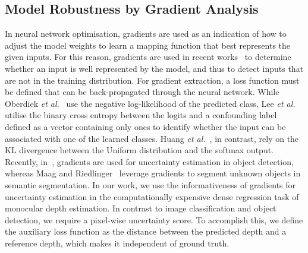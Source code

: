 \subsection{Model Robustness by Gradient Analysis}
In neural network optimisation, gradients are used as an indication of how to adjust the model weights to learn a mapping function that best represents the given inputs. For this reason, gradients are used in recent works~\cite{Oberdiek2018ClassificationUO,lee2022adversarial,Huang2021OnTI} to determine whether an input is well represented by the model, and thus to detect inputs that are not in the training distribution. For gradient extraction, a loss function must be defined that can be back-propagated through the neural network. While Oberdiek \textit{et al.}~\cite{Oberdiek2018ClassificationUO} use the negative log-likelihood of the predicted class, Lee \textit{et al.}~\cite{lee2022adversarial} utilise the binary cross entropy between the logits and a confounding label defined as a vector containing only ones to identify whether the input can be associated with one of the learned classes. Huang \textit{et al.}~\cite{Huang2021OnTI}, in contrast, rely on the KL divergence between the Uniform distribution and the softmax output. Recently, in~\cite{Riedlinger2021GradientBasedQO}, gradients are used for uncertainty estimation in object detection, whereas Maag and Riedlinger~\cite{Maag2023PixelwiseGU} leverage gradients to segment unknown objects in semantic segmentation. In our work, we use the informativeness of gradients for uncertainty estimation in the computationally expensive dense regression task of monocular depth estimation. In contrast to image classification and object detection, we require a pixel-wise uncertainty score. To accomplish this, we define the auxiliary loss function as the distance between the predicted depth and a reference depth, which makes it independent of ground truth.  

